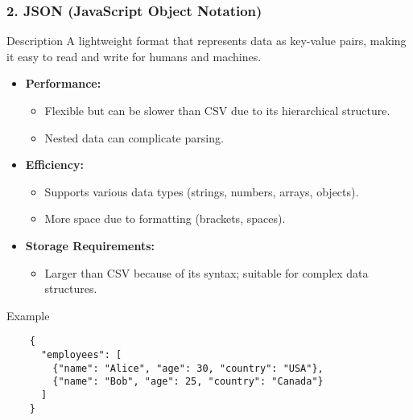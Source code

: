 \documentclass[aspectratio=169]{beamer}
\begin{document}
\begin{frame}[fragile]
    \frametitle{2. JSON (JavaScript Object Notation)}
    \begin{block}{Description}
        A lightweight format that represents data as key-value pairs, making it easy to read and write for humans and machines.
    \end{block}
    \begin{itemize}
        \item \textbf{Performance:}
        \begin{itemize}
            \item Flexible but can be slower than CSV due to its hierarchical structure.
            \item Nested data can complicate parsing.
        \end{itemize}
        \item \textbf{Efficiency:}
        \begin{itemize}
            \item Supports various data types (strings, numbers, arrays, objects).
            \item More space due to formatting (brackets, spaces).
        \end{itemize}
        \item \textbf{Storage Requirements:} 
        \begin{itemize}
            \item Larger than CSV because of its syntax; suitable for complex data structures.
        \end{itemize}
    \end{itemize}
    \begin{block}{Example}
    \begin{lstlisting}
    {
      "employees": [
        {"name": "Alice", "age": 30, "country": "USA"},
        {"name": "Bob", "age": 25, "country": "Canada"}
      ]
    }
    \end{lstlisting}
    \end{block}
\end{frame}
\end{document}
